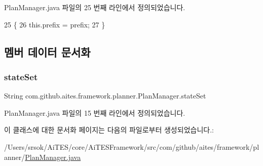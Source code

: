 Plan\+Manager.\+java 파일의 25 번째 라인에서 정의되었습니다.


\begin{DoxyCode}
25                                                 \{
26         this.prefix = prefix;
27     \}
\end{DoxyCode}


\subsection{멤버 데이터 문서화}
\mbox{\label{classcom_1_1github_1_1aites_1_1framework_1_1planner_1_1_plan_manager_a589a85c4c5b93ce2319ab116a4cca752}} 
\subsubsection{\texorpdfstring{state\+Set}{stateSet}}
{\footnotesize\ttfamily String com.\+github.\+aites.\+framework.\+planner.\+Plan\+Manager.\+state\+Set\hspace{0.3cm}{\ttfamily [private]}}



Plan\+Manager.\+java 파일의 15 번째 라인에서 정의되었습니다.



이 클래스에 대한 문서화 페이지는 다음의 파일로부터 생성되었습니다.\+:\begin{DoxyCompactItemize}
\item 
/\+Users/srsok/\+Ai\+T\+E\+S/core/\+Ai\+T\+E\+S\+Framework/src/com/github/aites/framework/planner/\mbox{\hyperlink{_plan_manager_8java}{Plan\+Manager.\+java}}\end{DoxyCompactItemize}

